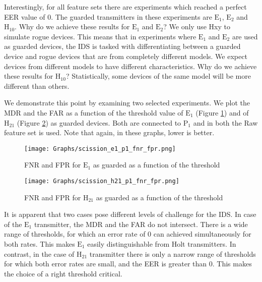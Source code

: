 \documentclass[conference]{IEEEtran}
\begin{document}
  Interestingly, for all feature sets there are experiments which reached a perfect EER value of 0. The guarded transmitters in these experiments are \(\text{E}_1\), \(\text{E}_2\) and \(\text{H}_{10}\). Why do we achieve these results for \(\text{E}_1\) and \(\text{E}_2\)? We only use Hxy to simulate rogue devices. This means that in experiments where \(\text{E}_1\) and \(\text{E}_2\) are used as guarded devices, the IDS is tasked with differentiating between a guarded device and rogue devices that are from completely different models. We expect devices from different models to have different characteristics. Why do we achieve these results for \(\text{H}_{10}\)? Statistically, some devices of the same model will be more different than others.
  
  We demonstrate this point by examining two selected experiments. We plot the MDR and the FAR as a function of the threshold value of \(\text{E}_1\) (Figure \ref{fig:detection_easy_example}) and of \(\text{H}_{21}\) (Figure \ref{fig:detection_difficult_example}) as guarded devices. Both are connected to \(\text{P}_1\) and in both the Raw feature set is used. Note that again, in these graphs, lower is better.
  
  \begin{figure}[t]
    \centering
    \texttt{[image: Graphs/scission\_e1\_p1\_fnr\_fpr.png]}
    \caption{FNR and FPR for \(\text{E}_1\) as guarded as a function of the threshold}
    \label{fig:detection_easy_example}
  \end{figure}
  
  \begin{figure}[t]
    \centering
    \texttt{[image: Graphs/scission\_h21\_p1\_fnr\_fpr.png]}
    \caption{FNR and FPR for \(\text{H}_{21}\) as guarded as a function of the threshold}
    \label{fig:detection_difficult_example}
  \end{figure}
  
  It is apparent that two cases pose different levels of challenge for the IDS.
  In case of the \(\text{E}_1\) transmitter, the MDR and the FAR do not intersect. There is a wide range of thresholds, for which an error rate of 0 can achieved simultaneously for both rates. This makes \(\text{E}_1\) easily distinguishable from Holt transmitters. In contrast, in the case of \(\text{H}_{21}\) transmitter there is only a narrow range of thresholds for which both error rates are small, and the EER is greater than 0. This makes the choice of a right threshold critical.
  
\end{document}
